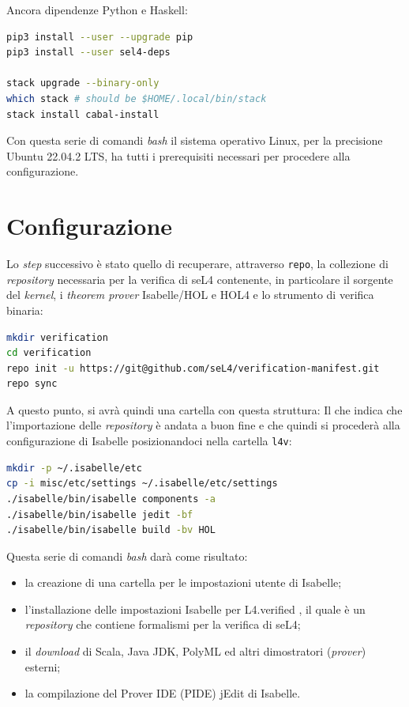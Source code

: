 Ancora dipendenze Python e Haskell:
\begin{lstlisting}[language=bash]
pip3 install --user --upgrade pip
pip3 install --user sel4-deps

stack upgrade --binary-only
which stack # should be $HOME/.local/bin/stack
stack install cabal-install
\end{lstlisting}

Con questa serie di comandi \textit{bash} il sistema operativo Linux, per la precisione Ubuntu 22.04.2 LTS, ha tutti i prerequisiti necessari per procedere alla configurazione.

\section{Configurazione}
Lo \textit{step} successivo è stato quello di recuperare, attraverso \texttt{repo}, la collezione di \textit{repository} necessaria per la verifica di seL4 contenente, in particolare il sorgente del \textit{kernel}, i \textit{theorem prover} Isabelle/HOL e HOL4 e lo strumento di verifica binaria:
\begin{lstlisting}[language=bash]
mkdir verification
cd verification
repo init -u https://git@github.com/seL4/verification-manifest.git
repo sync
\end{lstlisting}

A questo punto, si avrà quindi una cartella con questa struttura:
Il che indica che l'importazione delle \textit{repository} è andata a buon fine e che quindi si procederà alla configurazione di Isabelle posizionandoci nella cartella \texttt{l4v}:
\begin{lstlisting}[language=bash]
mkdir -p ~/.isabelle/etc
cp -i misc/etc/settings ~/.isabelle/etc/settings
./isabelle/bin/isabelle components -a
./isabelle/bin/isabelle jedit -bf
./isabelle/bin/isabelle build -bv HOL
\end{lstlisting}

Questa serie di comandi \textit{bash} darà come risultato:
\begin{itemize}
	\item la creazione di una cartella per le impostazioni utente di Isabelle;
	\item l'installazione delle impostazioni Isabelle per L4.verified \cite{l4v}, il quale è un \textit{repository} che contiene formalismi per la verifica di seL4;
	\item il \textit{download} di Scala, Java JDK, PolyML ed altri dimostratori (\textit{prover}) esterni;
	\item la compilazione del Prover IDE (PIDE) jEdit di Isabelle.
\end{itemize} 

